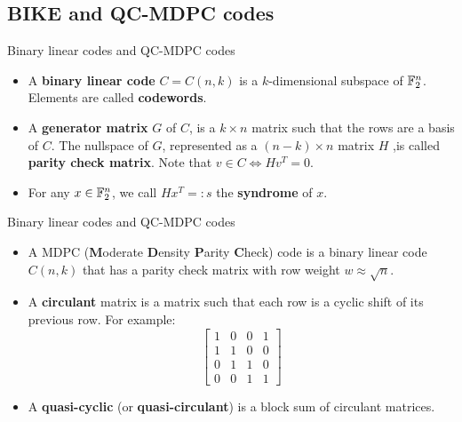 \subsection{BIKE and QC-MDPC codes}

\begin{frame}{Binary linear codes and QC-MDPC codes}

\begin{itemize}
    \item A \textbf{binary linear code} $C = C(n,k)$ is a $k$-dimensional subspace of $\mathbb{F}_2^n$. Elements are called \textbf{codewords}.
    \item A \textbf{generator matrix} $G$ of $C$, is a $k \times n$ matrix such that the rows are a basis of $C$. The nullspace of $G$, represented as a $(n-k)  \times n$ matrix $H$ ,is called \textbf{parity check matrix}. Note that $v \in C \iff Hv^T=0$.
    \item For any $x \in \mathbb{F}_2^n$, we call $Hx^T =: s$ the \textbf{syndrome} of $x$.
    \end{itemize}

\end{frame}

\begin{frame}{Binary linear codes and QC-MDPC codes}

\begin{itemize}
    \item A MDPC (\textbf{M}oderate \textbf{D}ensity \textbf{P}arity \textbf{C}heck) code is a binary linear code $C(n,k)$ that has a parity check matrix with row weight $w \approx \sqrt{n}$.
    \item A \textbf{circulant} matrix is a matrix such that each row is a cyclic shift of its previous row. For example:
    \[
    \begin{bmatrix}
    1 & 0 & 0 & 1 \\
    1 & 1 & 0 & 0 \\
    0 & 1 & 1 & 0 \\
    0 & 0 & 1 & 1
    \end{bmatrix}
    \]
    \item A \textbf{quasi-cyclic} (or \textbf{quasi-circulant}) is a block sum of circulant matrices.
\end{itemize}
    
\end{frame}

